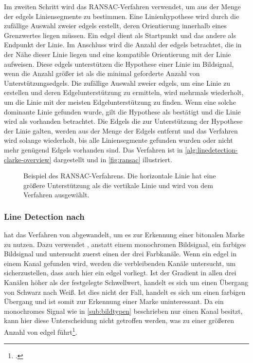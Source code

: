 Im zweiten Schritt wird das RANSAC-Verfahren verwendet, um aus der Menge der \glspl{edgel} Liniensegmente zu bestimmen.
 Eine Linienhypothese wird durch die zufällige Auswahl zweier \glspl{edgel} erstellt, deren Orientierung innerhalb
 eines Grenzwertes liegen müssen. Ein \gls{edgel} dient als Startpunkt und das andere als Endpunkt der Linie. Im
 Anschluss wird die Anzahl der \glspl{edgel} betrachtet, die in der Nähe dieser Linie liegen und eine kompatible
 Orientierung mit der Linie aufweisen. Diese \glspl{edgel} unterstützen die Hypothese einer Linie im Bildsignal, wenn
 die Anzahl größer ist als die minimal geforderte Anzahl von Unterstützungsedgels. Die zufällige Auswahl zweier
 \glspl{edgel}, um eine Linie zu erstellen und deren Edgelunterstützung zu ermitteln, wird mehrmals wiederholt, um die
 Linie mit der meisten Edgelunterstützung zu finden. Wenn eine solche dominante Linie gefunden wurde, gilt die
 Hypothese als bestätigt und die Linie wird als vorhanden betrachtet. Die Edgels die zur Unterstützung der Hypothese
 der Linie galten, werden aus der Menge der Edgels entfernt und das Verfahren wird solange wiederholt, bis alle
 Liniensegmente gefunden wurden oder nicht mehr genügend Edgels vorhanden sind. Das Verfahren ist in
 \autoref{alg:linedetection-clarke-overview} dargestellt und in \autoref{fig:ransac} illustriert.

\begin{figure}[!ht]
	\centering
	
	\caption{Beispiel des RANSAC-Verfahrens. Die horizontale Linie hat eine größere Unterstützung als die vertikale
	 Linie und wird von dem Verfahren ausgewählt.}
	\label{fig:ransac}
\end{figure}

\subsubsection{Line Detection nach \texorpdfstring{\citeauthor{hirzer08}}{Hirzer}} %
\label{sub:line_detection_hirzer}

\citeauthor{hirzer08} hat das Verfahren von \citeauthor{clarke96} abgewandelt, um es zur Erkennung einer bitonalen
 Marke zu nutzen. Dazu verwendet \citeauthor{hirzer08}, anstatt einem monochromen Bildsignal, ein farbiges Bildsignal
 und untersucht zuerst einen der drei Farbkanäle. Wenn ein \gls{edgel} in einem Kanal gefunden wird, werden die
 verbleibenden Kanäle untersucht, um sicherzustellen, dass auch hier ein \gls{edgel} vorliegt. Ist der Gradient in
 allen drei Kanälen höher als der festgelegte Schwellwert, handelt es sich um einen Übergang  von Schwarz nach Weiß.
 Ist dies nicht der Fall, handelt es sich um einen farbigen Übergang und ist somit zur Erkennung einer Marke
 uninteressant. Da ein monochromes Signal wie in \autoref{sub:bildtypen} beschrieben nur einen Kanal besitzt, kann hier
 diese Unterscheidung nicht getroffen werden, was zu einer größeren Anzahl von \gls{edgel}
 führt\footcite[Vgl.][S.~6--7]{hirzer08}.

